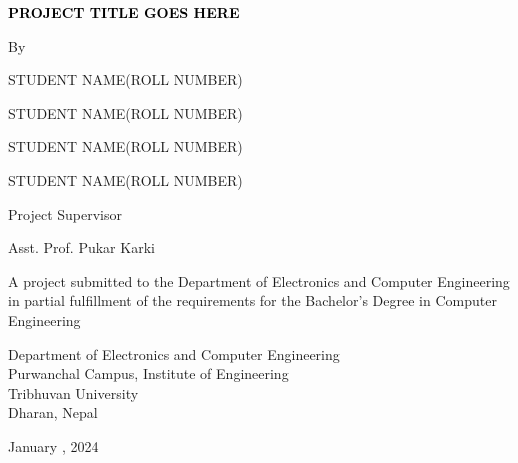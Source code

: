 \begin{titlepage}
    \centering
    
    {\fontsize{12pt}{14pt}\bfseries\textcolor{black}{PROJECT TITLE GOES HERE}\par}
    \vspace{2.0cm}
       {By} \par {STUDENT NAME}({ROLL NUMBER})
            \par {STUDENT NAME}({ROLL NUMBER})
            \par {STUDENT NAME}({ROLL NUMBER})
            \par {STUDENT NAME}({ROLL NUMBER})
       \vspace{2.0cm}\par
    Project Supervisor\par
    Asst. Prof. Pukar Karki\par
    \vspace{2.0cm}
    {A project submitted to the Department of Electronics and Computer Engineering in partial fulfillment of the requirements for the Bachelor’s Degree in Computer Engineering}\par
        \vspace{2.0cm}\par

    {Department of Electronics and Computer Engineering\\ Purwanchal Campus, Institute of Engineering \\ Tribhuvan University\\ Dharan, Nepal}\par
        \vspace{2.0cm}\par
        
   {January , 2024}
   
\end{titlepage}



